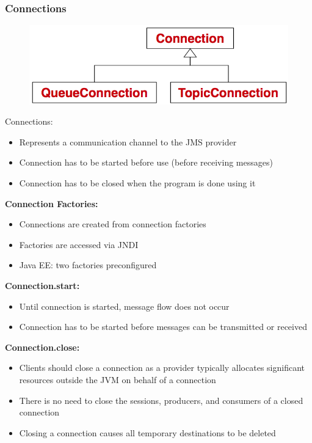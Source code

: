 \documentclass[10pt]{article}
\begin{document}
\subsubsection{Connections}
\begin{figure}
	\centering
	\includegraphics[scale=0.2]{images/jms-api-connection.png}%
\end{figure}
Connections:
\begin{itemize}
	\item Represents a communication channel to the JMS provider
	\item Connection has to be started before use (before receiving messages)
	\item Connection has to be closed when the program is done using it
\end{itemize}
\textbf{Connection Factories:}
\begin{itemize}
	\item Connections are created from connection factories
	\item Factories are accessed via JNDI	
	\item Java EE: two factories preconfigured
\end{itemize}
\textbf{Connection.start:}
\begin{itemize}
	\item Until connection is started, message flow does not occur
	\item Connection has to be started before messages can be transmitted or received
\end{itemize}
\textbf{Connection.close:}
\begin{itemize}
	\item Clients should close a connection as a provider typically allocates significant resources outside the JVM on behalf of a connection
	\item There is no need to close the sessions, producers, and consumers of a closed connection
	\item Closing a connection causes all temporary destinations to be deleted
\end{itemize}
\end{document}
